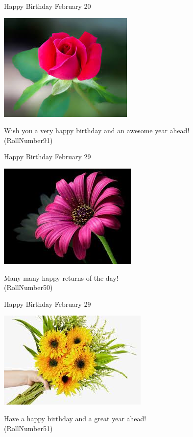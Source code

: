 \documentclass[table, landscape]{beamer}
\begin{document}
\begin{frame}{\color{red}Happy Birthday }
{February 20}
\begin{center}
\includegraphics[height=0.5\textheight]{flowers/f3.jpeg}

Wish you a very happy birthday and an awesome year ahead! \\ \vspace{0.5cm}{\Large name84} (RollNumber91)
\end{center}
\end{frame}
\begin{frame}{\color{blue}Happy Birthday }
{February 29}
\begin{center}
\includegraphics[height=0.5\textheight]{flowers/f2.jpeg}

Many many happy returns of the day! \\ \vspace{0.5cm}{\Large name43} (RollNumber50)
\end{center}
\end{frame}
\begin{frame}{\color{red}Happy Birthday }
{February 29}
\begin{center}
\includegraphics[height=0.5\textheight]{flowers/f6.jpeg}

Have a happy birthday and a great year ahead! \\ \vspace{0.5cm}{\Large name44} (RollNumber51)
\end{center}
\end{frame}
\end{document}
